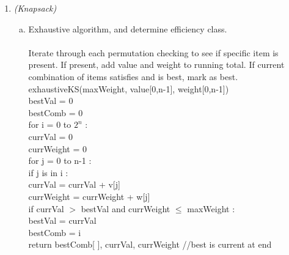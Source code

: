 \documentclass[11pt]{article}
\begin{document}
\begin{enumerate}
	\item \textit{(Knapsack)}
		\begin{enumerate}[(a)]
			\item Exhaustive algorithm, and determine efficiency class. \\\\
				Iterate through each permutation checking to see if specific item is present. If present, add value and weight to running total. If current combination of items satisfies and is best, mark as best.  \\
				exhaustiveKS(maxWeight, value[0,n-1], weight[0,n-1]) \\
					\hspace*{.4cm}
					bestVal = 0 \\
					\hspace*{.4cm}
					bestComb = 0 \\
					\hspace*{.4cm}
					for i = 0 to $ 2^n $ : \\
						\hspace*{.8cm}
						currVal = 0 \\
						\hspace*{.8cm}
						currWeight = 0 \\
						\hspace*{.8cm}
						for j = 0 to n-1 : \\
							\hspace*{1.2cm}
							if j is in i : \\
								\hspace*{1.6cm}
								currVal = currVal + v[j] \\
								\hspace*{1.6cm}
								currWeight = currWeight + w[j] \\
						\hspace*{.8cm}
						if currVal $ > $ bestVal and currWeight $ \leq $ maxWeight : \\
							\hspace*{1.2cm}
							bestVal = currVal \\
							\hspace*{1.2cm}
							bestComb = i \\
					\hspace*{.4cm}
					return bestComb[ ], currVal, currWeight  //best is current at end \\
				

\end{enumerate}
\end{enumerate}
\end{document}
